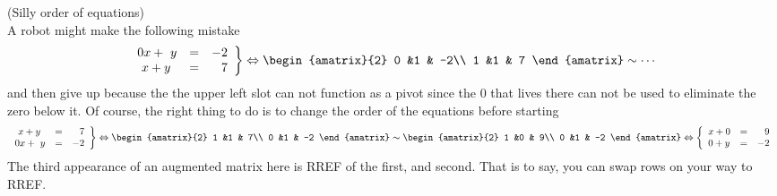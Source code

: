 \begin{example} (Silly order of equations)\\
A robot might make the following mistake
 \begin{eqnarray*}
   \left.
\begin{array}{lcr}
	0x +  \ y & = & -2 \\
	\ x + y & = &  7
     \end{array}
   \right\} 
   \Leftrightarrow 
\begin{amatrix}{2}
0 &1 & -2\\ 1 &1 & 7
\end{amatrix}
\sim \cdots
\end{eqnarray*}  
and then give up because the the upper left slot can not function as a pivot since the 0 that lives there can not be used to eliminate the zero below it. Of course, the right thing to do is to change the order of the equations before starting
 \begin{eqnarray*}
   \left.
\begin{array}{lcr}
	\ x + y & = &  7
	\\
	0x +  \ y & = & -2 
	     \end{array}
   \right\} 
   \Leftrightarrow
\begin{amatrix}{2}
1 &1 & 7\\ 0 &1 & -2
\end{amatrix}
\sim 
\begin{amatrix}{2}
1 &0 & 9\\ 0 &1 & -2
\end{amatrix}
\Leftrightarrow
\left\{
\begin{array}{lcr}
	x + 0 & = & 9 \\
	 0 + y & = & -2
     \end{array}
   \right.
\end{eqnarray*}  
The third appearance of an augmented matrix here is RREF of the first, and second. That is to say, you can swap rows on your way to RREF.
\end{example}



